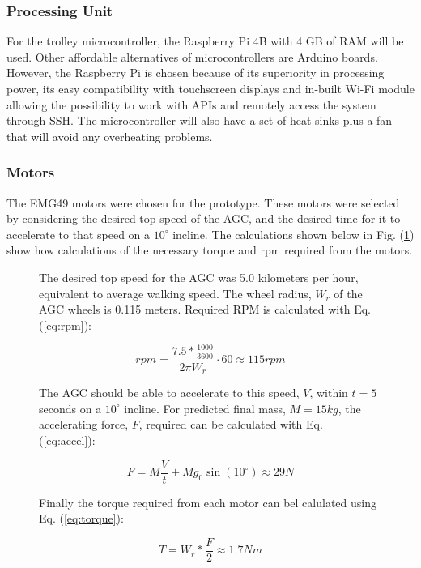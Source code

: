 \documentclass[11pt,landscape]{article}
\begin{document}
\begin{multicols}{3}
\subsubsection{Processing Unit}
For the trolley microcontroller, the Raspberry Pi 4B with 4 GB of RAM will be
used. Other affordable alternatives of microcontrollers are Arduino boards.
However, the Raspberry Pi is chosen because of its superiority in processing
power, its easy compatibility with touchscreen displays and in-built Wi-Fi
module allowing the possibility to work with APIs and remotely access the system
through SSH. The microcontroller will also have a set of heat sinks plus a fan
that will avoid any overheating problems.


\subsubsection{Motors}
The EMG49 motors were chosen for the prototype. These motors were selected by
considering the desired top speed of the AGC, and the desired time for it
to accelerate to that speed on a $10^\circ$ incline. The calculations shown
below in Fig. (\ref{fig:motor_calcs}) show how calculations of the necessary
torque and rpm required from the motors.

\begin{figure}[H]
    \begin{mdframed}
        The desired top speed for the AGC was 5.0 kilometers per hour,
        equivalent to average walking speed. The wheel radius, $W_r$ of the AGC
        wheels is 0.115 meters. Required RPM is calculated with Eq. (\ref{eq:rpm}):
        \begin{center}
            \begin{equation}
                rpm = \frac{7.5 * \frac{1000}{3600}}{2\pi W_r} \cdot 60 \approx 115rpm
                \label{eq:rpm}
            \end{equation}
        \end{center}
        The AGC should be able to accelerate to this speed, $V$, within $t=5$
        seconds on a $10^\circ$ incline. For predicted final mass, $M = 15kg$,
        the accelerating force, $F$, required can be calculated with Eq.
        (\ref{eq:accel}):
        \begin{center}
            \begin{equation}
                F = M\frac{V}{t} + M g_0 \sin(10^\circ)\approx 29 N
                \label{eq:accel}
            \end{equation}
        \end{center}
        Finally the torque required from each motor can bel calulated using Eq.
        (\ref{eq:torque}):
        \begin{center}
            \begin{equation}
                T = W_r * \frac{F}{2} \approx 1.7 Nm
                \label{eq:torque} 
            \end{equation}
        \end{center}
    \end{mdframed}
    \label{fig:motor_calcs}
\end{figure}


\end{multicols}
\end{document}
